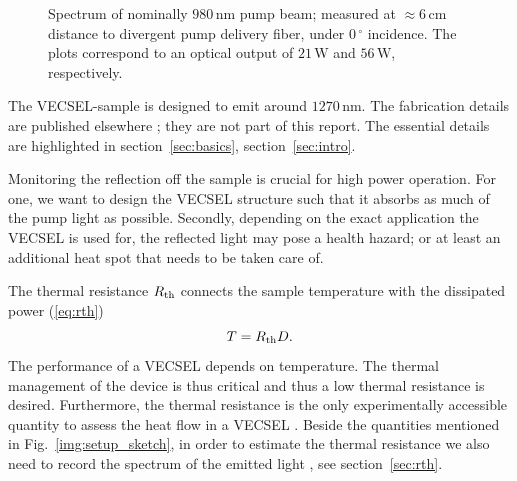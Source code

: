 \begin{figure}
\centering
{}
\caption{Spectrum of nominally $980\,\mathrm{nm}$ pump beam;
measured at $\approx6\,\mathrm{cm}$ distance to
divergent pump delivery fiber,
under $0\,^\circ$ incidence.
The plots correspond to an optical output of
$21\,\mathrm{W}$ and $56\,\mathrm{W}$,
respectively.}
\label{img:pumpspectrum}
\end{figure}

The VECSEL-sample is designed to emit
around $1270\,\mathrm{nm}$.
The fabrication details are published elsewhere
\cite{Ranta2014OptLett,Sirbu2014SPIE};
they are not part of this report.
The essential details are highlighted
in section~\ref{sec:basics},
section~\ref{sec:intro}.

Monitoring the reflection
off the sample
is crucial for high power operation.
For one,
we want to design the VECSEL structure
such that it absorbs as much
of the pump light as possible.
Secondly, depending on the exact application
the VECSEL is used for,
the reflected light may pose
a health hazard;
or at least an additional heat spot
that needs to be taken care of.

The thermal resistance $R_\mathrm{th}$
connects the sample temperature
with the dissipated power (\ref{eq:rth})
\begin{equation}
T = R_\mathrm{th} D.
\end{equation}
The performance of a VECSEL depends on temperature.
The thermal management of the device is thus critical
\cite{Tropper2006,Kemp2008,Vetter2012}
and thus a low thermal resistance is desired.
Furthermore,
the thermal resistance
is the only experimentally accessible quantity
to assess the heat flow in a VECSEL \cite{Heinen2012}.
Beside the quantities mentioned in Fig.~\ref{img:setup_sketch},
in order to estimate the thermal resistance
we also need to record the spectrum of the emitted light
\cite{Ranta2014OptLett,Heinen2012},
see section~\ref{sec:rth}.

